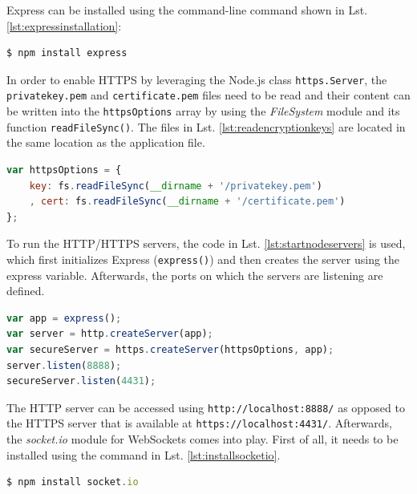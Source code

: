 Express can be installed using the command-line command shown in Lst. \ref{lst:expressinstallation}:\\

\begin{lstlisting}[language=javascript,
caption={Installing Express via command-line},
label=lst:expressinstallation,
morekeywords={npm}]
$ npm install express 
\end{lstlisting}%

In order to enable HTTPS by leveraging the Node.js class \texttt{https.Server}, the \texttt{privatekey.pem} and \texttt{certificate.pem} files need to be read and their content can be written into the \texttt{httpsOptions} array by using the \textit{FileSystem} module and its function \texttt{readFileSync()}. The files in Lst. \ref{lst:readencryptionkeys} are located in the same location as the application file.

\begin{lstlisting}[language=javascript,caption={Reading encryption keys},label=lst:readencryptionkeys]
var httpsOptions = {
    key: fs.readFileSync(__dirname + '/privatekey.pem')
    , cert: fs.readFileSync(__dirname + '/certificate.pem')
};
\end{lstlisting}

To run the HTTP/HTTPS servers, the code in Lst. \ref{lst:startnodeservers} is used, which first
initializes Express (\texttt{express()}) and then creates the server using the express variable.
Afterwards, the ports on which the servers are listening are defined.

\begin{lstlisting}[language=javascript,caption={Starting servers in Node.js},label=lst:startnodeservers]
var app = express();
var server = http.createServer(app);
var secureServer = https.createServer(httpsOptions, app);
server.listen(8888);
secureServer.listen(4431);
\end{lstlisting}

The HTTP server can be accessed using \texttt{http://localhost:8888/} as opposed to the
HTTPS server that is available at \texttt{https://localhost:4431/}. Afterwards, the
\textit{socket.io} module for WebSockets comes into play. First of all, it needs to be
installed using the command in Lst. \ref{lst:installsocketio}.

\begin{lstlisting}[language=javascript,
caption={Command to install socket.io via Node.js' package manager},
label=lst:installsocketio,
morekeywords={npm}]
$ npm install socket.io
\end{lstlisting}%

